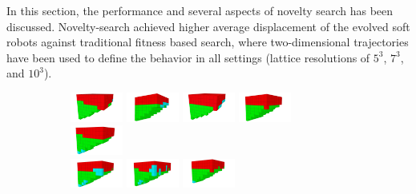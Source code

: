 In this section, the performance and several aspects of novelty search has been discussed. Novelty-search achieved higher average displacement of the evolved soft robots against traditional fitness based search, where two-dimensional trajectories have been used to define the behavior in all settings (lattice resolutions of $5^3$, $7^3$, and $10^3$).


\begin{figure}[t!]
\centering
\begin{subfigure}[b]{1.0\textwidth}
\includegraphics[width=0.19\textwidth]{../Figures/Robots/f_4_g_100.jpg}
\includegraphics[width=0.19\textwidth]{../Figures/Robots/f_4_g_200.jpg}
\includegraphics[width=0.19\textwidth]{../Figures/Robots/f_4_g_300.jpg}
\includegraphics[width=0.19\textwidth]{../Figures/Robots/f_4_g_400.jpg}
\includegraphics[width=0.19\textwidth]{../Figures/Robots/f_4_g_500.jpg}\\
\includegraphics[width=0.19\textwidth]{../Figures/Robots/f_4_g_600.jpg}
\includegraphics[width=0.19\textwidth]{../Figures/Robots/f_4_g_700.jpg}
\includegraphics[width=0.19\textwidth]{../Figures/Robots/f_4_g_800.jpg}

\end{subfigure}
\end{figure}
